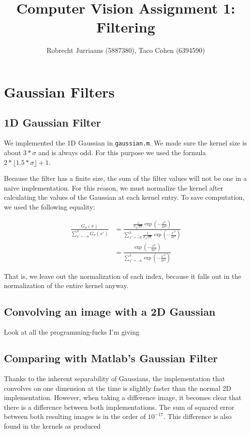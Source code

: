 \documentclass[a4paper,10pt]{article}
\title{Computer Vision Assignment 1: Filtering}
\author{Robrecht Jurriaans (5887380), Taco Cohen (6394590)}
\begin{document}
\maketitle

\section{Gaussian Filters}

\subsection{1D Gaussian Filter}
We implemented the 1D Gaussian in \verb+gaussian.m+.
We made sure the kernel size is about $3*\sigma$ and is always odd.
For this purpose we used the formula $2 * \lfloor 1.5 * \sigma \rfloor + 1$.

Because the filter has a finite size, the sum of the filter values will not be one in a naive implementation.
For this reason, we must normalize the kernel after calculating the values of the Gaussian at each kernel entry.
To save computation, we used the following equality:

\begin{align*}
 \frac{G_{\sigma}(x)}{\sum_{x'=-h}^h G_{\sigma}(x')} &= \frac{ \frac{1}{\sigma \sqrt{2 \pi}} \exp(-\frac{x^2}{2 \sigma^2})}
       {\sum_{x'=-h}^h \frac{1}{\sigma \sqrt{2 \pi}} \exp(-\frac{x'^2}{2 \sigma^2})} \\
&= \frac{ \exp(-\frac{x^2}{2 \sigma^2})}
       {\sum_{x'=-h}^h \exp(-\frac{x'^2}{2 \sigma^2})}
\end{align*}

That is, we leave out the normalization of each index, because it falls out in the normalization of the entire kernel anyway.

\subsection{Convolving an image with a 2D Gaussian}
Look at all the programming-fucks I'm giving

\subsection{Comparing with Matlab's Gaussian Filter}
Thanks to the inherent separability of Gaussians, the implementation that convolves on one dimension at the time is slightly faster than the normal 2D implementation. However, when taking a difference image, it becomes clear that there is a difference between both implementations. The sum of squared error between both resulting images is in the order of $10^{-17}$. This difference is also found in the kernels as produced 
\end{document}

